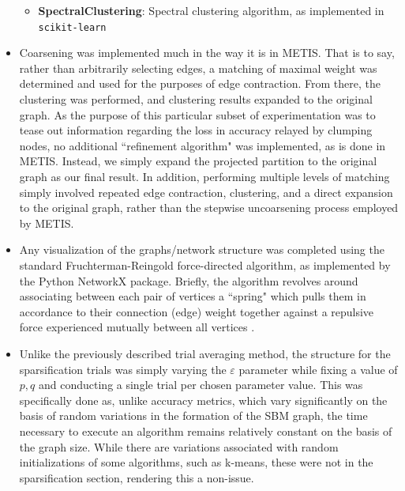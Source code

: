 \documentclass{article}
\begin{document}
\begin{itemize}
\begin{itemize}
        \item \textbf{SpectralClustering}: Spectral clustering algorithm, as implemented in \texttt{scikit-learn}
    \end{itemize}
    \item Coarsening was implemented much in the way it is in METIS. That is to say, rather than arbitrarily selecting edges, a matching of maximal weight was determined and used for the purposes of edge contraction. From there, the clustering was performed, and clustering results expanded to the original graph. As the purpose of this particular subset of experimentation was to tease out information regarding the loss in accuracy relayed by clumping nodes, no additional ``refinement algorithm" was implemented, as is done in METIS. Instead, we simply expand the projected partition to the original graph as our final result. In addition, performing multiple levels of matching simply involved repeated edge contraction, clustering, and a direct expansion to the original graph, rather than the stepwise uncoarsening process employed by METIS.
    \item Any visualization of the graphs/network structure was completed using the standard Fruchterman-Reingold force-directed algorithm, as implemented by the Python NetworkX package. Briefly, the algorithm revolves around associating between each pair of vertices a ``spring" which pulls them in accordance to their connection (edge) weight together against a repulsive force experienced mutually between all vertices \cite{graph-viz}.
    \item Unlike the previously described trial averaging method, the structure for the sparsification trials was simply varying the $\varepsilon$ parameter while fixing a value of $p,q$ and conducting a single trial per chosen parameter value. This was specifically done as, unlike accuracy metrics, which vary significantly on the basis of random variations in the formation of the SBM graph, the time necessary to execute an algorithm remains relatively constant on the basis of the graph size. While there are variations associated with random initializations of some algorithms, such as k-means, these were not in the sparsification section, rendering this a non-issue.
\end{itemize}
\end{document}
